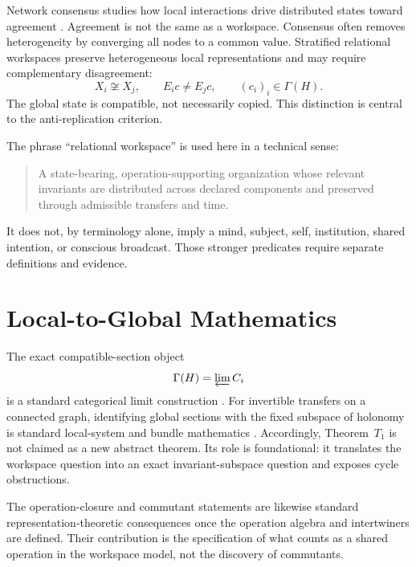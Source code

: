 
Network consensus studies how local interactions drive distributed states
toward agreement \cite{SRWT:OlfatiSaberEtAl2007}. Agreement is not the same as a
workspace. Consensus often removes heterogeneity by converging all nodes to a
common value. Stratified relational workspaces preserve heterogeneous local
representations and may require complementary disagreement:
\[
X_i\not\cong X_j,
\qquad
E_i c\neq E_j c,
\qquad
(c_i)_i\in\Gamma(H).
\]
The global state is compatible, not necessarily copied. This distinction is
central to the anti-replication criterion.


The phrase ``relational workspace'' is used here in a technical sense:
\begin{quote}
A state-bearing, operation-supporting organization whose relevant invariants
are distributed across declared components and preserved through admissible
transfers and time.
\end{quote}
It does not, by terminology alone, imply a mind, subject, self, institution,
shared intention, or conscious broadcast. Those stronger predicates require
separate definitions and evidence.

\section{Local-to-Global Mathematics}


The exact compatible-section object
\[
\Gamma(H)=\varprojlim C_i
\]
is a standard categorical limit construction \cite{SRWT:MacLane1998}. For
invertible transfers on a connected graph, identifying global sections with
the fixed subspace of holonomy is standard local-system and bundle mathematics
\cite{SRWT:Hatcher2002,SRWT:Bredon1997}. Accordingly, Theorem~\(T_1\) is not claimed as
a new abstract theorem. Its role is foundational: it translates the workspace
question into an exact invariant-subspace question and exposes cycle
obstructions.

The operation-closure and commutant statements are likewise standard
representation-theoretic consequences once the operation algebra and
intertwiners are defined. Their contribution is the specification of what
counts as a shared operation in the workspace model, not the discovery of
commutants.


